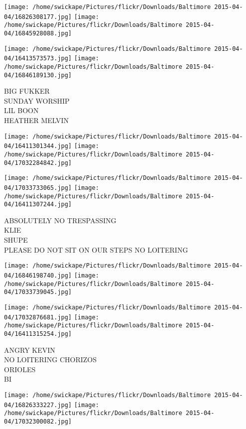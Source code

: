 \documentclass[10pt,letterpaper]{article}
\begin{document}
\texttt{[image: /home/swickape/Pictures/flickr/Downloads/Baltimore 2015-04-04/16826308177.jpg]}
\texttt{[image: /home/swickape/Pictures/flickr/Downloads/Baltimore 2015-04-04/16845928088.jpg]}

\texttt{[image: /home/swickape/Pictures/flickr/Downloads/Baltimore 2015-04-04/16413573573.jpg]}
\texttt{[image: /home/swickape/Pictures/flickr/Downloads/Baltimore 2015-04-04/16846189130.jpg]}

BIG FUKKER\\
SUNDAY WORSHIP\\
LIL BOON\\
HEATHER MELVIN\\
\pagebreak

\texttt{[image: /home/swickape/Pictures/flickr/Downloads/Baltimore 2015-04-04/16411301344.jpg]}
\texttt{[image: /home/swickape/Pictures/flickr/Downloads/Baltimore 2015-04-04/17032284842.jpg]}

\texttt{[image: /home/swickape/Pictures/flickr/Downloads/Baltimore 2015-04-04/17033733065.jpg]}
\texttt{[image: /home/swickape/Pictures/flickr/Downloads/Baltimore 2015-04-04/16411307244.jpg]}

ABSOLUTELY NO TRESPASSING\\
KLIE\\
SHUPE\\
PLEASE DO NOT SIT ON OUR STEPS NO LOITERING\\
\pagebreak

\texttt{[image: /home/swickape/Pictures/flickr/Downloads/Baltimore 2015-04-04/16846198740.jpg]}
\texttt{[image: /home/swickape/Pictures/flickr/Downloads/Baltimore 2015-04-04/17033739045.jpg]}

\texttt{[image: /home/swickape/Pictures/flickr/Downloads/Baltimore 2015-04-04/17032876681.jpg]}
\texttt{[image: /home/swickape/Pictures/flickr/Downloads/Baltimore 2015-04-04/16411315254.jpg]}

ANGRY KEVIN\\
NO LOITERING CHORIZOS\\
ORIOLES\\
BI\\
\pagebreak

\texttt{[image: /home/swickape/Pictures/flickr/Downloads/Baltimore 2015-04-04/16826333227.jpg]}
\texttt{[image: /home/swickape/Pictures/flickr/Downloads/Baltimore 2015-04-04/17032300082.jpg]}
\end{document}
